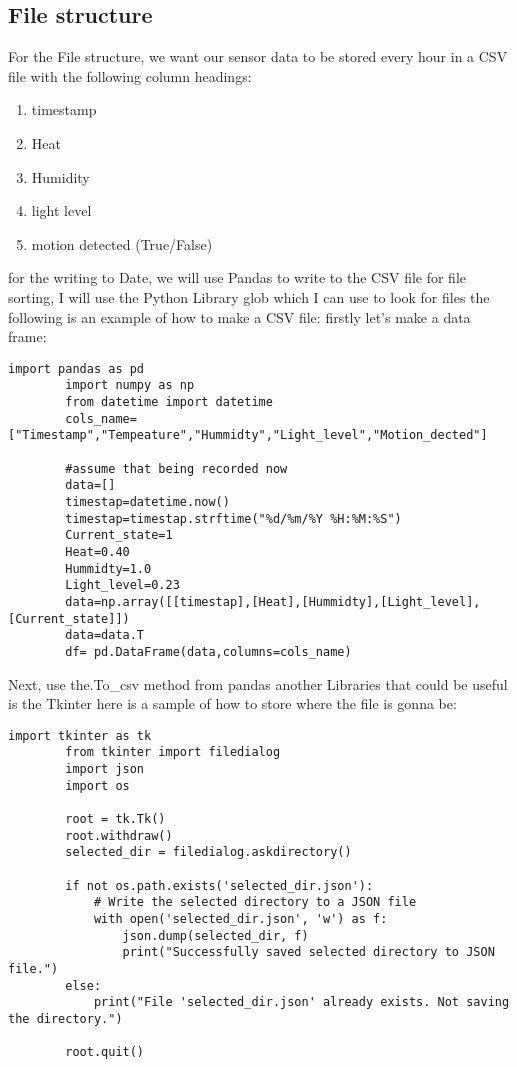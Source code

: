 	\subsection{File structure}
	For the  File structure, we want our sensor data to be stored every hour in a  CSV file with the following column headings:
	\begin{enumerate}
		\item timestamp
		\item Heat
		\item Humidity
		\item light level
		\item motion detected (True/False)
	\end{enumerate}
	for the writing to Date, we will use Pandas to write to the CSV file
	for file sorting, I will use the Python Library glob  which I can use  to look for  files 
	the following is an example of how  to  make a CSV file:
	firstly let's make a data frame:
	\begin{lstlisting}[style=mystyle,caption={sample code for turning sensor data into a data}]
		import pandas as pd
		import numpy as np
		from datetime import datetime
		cols_name=["Timestamp","Tempeature","Hummidty","Light_level","Motion_dected"]

		#assume that being recorded now
		data=[]
		timestap=datetime.now()
		timestap=timestap.strftime("%d/%m/%Y %H:%M:%S")
		Current_state=1
		Heat=0.40
		Hummidty=1.0
		Light_level=0.23
		data=np.array([[timestap],[Heat],[Hummidty],[Light_level],[Current_state]])
		data=data.T
		df= pd.DataFrame(data,columns=cols_name)
	\end{lstlisting}
	Next, use the.To\_csv method from  pandas
	another Libraries that could  be useful is the Tkinter
	here is a  sample of how to   store where the  file is  gonna be:
	\begin{lstlisting}[style=mystyle,caption={example code for storing directory}]
		import tkinter as tk
		from tkinter import filedialog
		import json
		import os

		root = tk.Tk()
		root.withdraw()
		selected_dir = filedialog.askdirectory()

		if not os.path.exists('selected_dir.json'):
			# Write the selected directory to a JSON file
			with open('selected_dir.json', 'w') as f:
				json.dump(selected_dir, f)
				print("Successfully saved selected directory to JSON file.")
		else:
			print("File 'selected_dir.json' already exists. Not saving the directory.")

		root.quit()
	\end{lstlisting}
